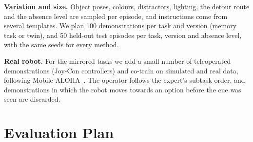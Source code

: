 \documentclass[conference]{IEEEtran}
\begin{document}
\textbf{Variation and size.} Object poses, colours, distractors, lighting, the detour route and the absence level are sampled per episode, and instructions come from several templates. We plan 100 demonstrations per task and version (memory task or twin), and 50 held-out test episodes per task, version and absence level, with the same seeds for every method.

\textbf{Real robot.} For the mirrored tasks we add a small number of teleoperated demonstrations (Joy-Con controllers) and co-train on simulated and real data, following Mobile ALOHA~\cite{fu2025mobilealoha}. The operator follows the expert's subtask order, and demonstrations in which the robot moves towards an option before the cue was seen are discarded.

\section{Evaluation Plan}
\end{document}
